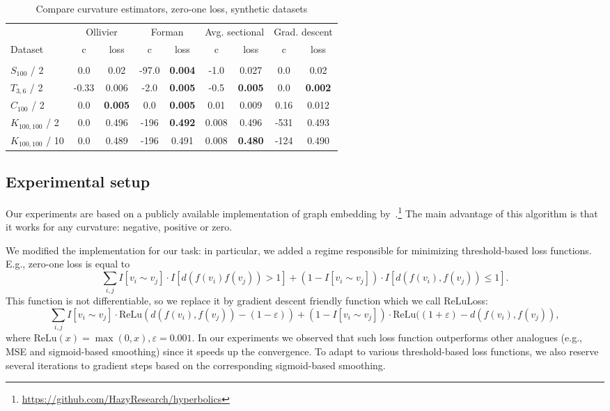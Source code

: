 \documentclass{article} %
\begin{document}
\begin{table}[t]
\caption{Compare curvature estimators, zero-one loss, synthetic datasets}
\label{tab:compare_zero_one_synth}
\begin{center}
\begin{tabular}{lcccccc|cc}
&
\multicolumn{2}{c}{Ollivier} &
\multicolumn{2}{c}{Forman} &
\multicolumn{2}{c}{Avg. sectional} &
\multicolumn{2}{|c}{Grad. descent} 
\\
Dataset & c & loss  & c & loss  & c & loss & c & loss %
\\
\hline \\
$S_{100}$ / 2 &
0.0 & 0.02 & 
-97.0 & \textbf{0.004} & 
-1.0 & 0.027 &
0.0 & 0.02
\\
$T_{3,6}$ / 2 &
-0.33 & 0.006 & 
-2.0 & \textbf{0.005} & 
-0.5 & \textbf{0.005} & 
0.0 & \textbf{0.002}  
\\
$C_{100}$ / 2 & 
0.0 & \textbf{0.005} & 
0.0 & \textbf{0.005} &
0.01 & 0.009 & 
0.16 & 0.012
\\
$K_{100,100}$ / 2 &
0.0 & 0.496 & 
-196 & \textbf{0.492} & 
0.008 & 0.496 & 
-531 & 0.493 
\\
$K_{100,100}$ / 10 &
0.0 & 0.489 & 
-196 & 0.491 & 
0.008 & \textbf{0.480} & 
-124 & 0.490 
\\
\end{tabular}
\end{center}
\end{table}

\subsection{Experimental setup}\label{sec:setup}

Our experiments are based on a publicly available implementation of graph embedding by~\citet{gu2019learning}.\footnote{\url{https://github.com/HazyResearch/hyperbolics}} The main advantage of this algorithm is that it works for any curvature: negative, positive or zero. 

We modified the implementation for our task: in particular, we added a regime responsible for minimizing threshold-based loss functions. 
E.g., zero-one loss is equal to
\[
\sum_{i,j}  I[v_i \sim v_j] \cdot I[d(f(v_i)f(v_j)) > 1] + (1 - I[v_i \sim v_j]) \cdot I[d(f(v_i),f(v_j)) \le 1].
\]
This function is not differentiable, so we replace it by gradient descent friendly function which we call ReLuLoss:
\[
\sum_{i,j}  I[v_i \sim v_j] \cdot \mathrm{ReLu}(d(f(v_i),f(v_j)) - (1 - \varepsilon)) + (1 - I[v_i \sim v_j]) \cdot \mathrm{ReLu}((1 + \varepsilon) -d(f(v_i),f(v_j)),
\]
where 
$ \mathrm{ReLu}(x) = \max(0, x), \varepsilon = 0.001$.
In our experiments we observed that such loss function outperforms other analogues (e.g., MSE and sigmoid-based smoothing) since it speeds up the convergence. To adapt to various threshold-based loss functions, we also reserve several iterations to gradient steps based on the corresponding sigmoid-based smoothing.
\end{document}
